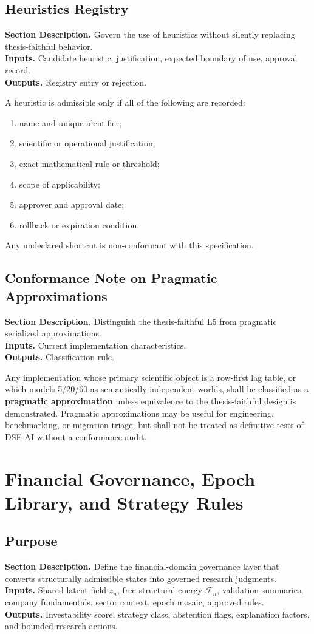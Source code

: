 \documentclass[11pt]{report}
\newcommand{\meta}[3]{\textbf{Section Description.} #1\\
\textbf{Inputs.} #2\\
\textbf{Outputs.} #3\par}
\begin{document}
\section{Heuristics Registry}
\meta{Govern the use of heuristics without silently replacing thesis-faithful behavior.}{Candidate heuristic, justification, expected boundary of use, approval record.}{Registry entry or rejection.}

A heuristic is admissible only if all of the following are recorded:
\begin{enumerate}[leftmargin=1.2cm]
    \item name and unique identifier;
    \item scientific or operational justification;
    \item exact mathematical rule or threshold;
    \item scope of applicability;
    \item approver and approval date;
    \item rollback or expiration condition.
\end{enumerate}
Any undeclared shortcut is non-conformant with this specification.

\section{Conformance Note on Pragmatic Approximations}
\meta{Distinguish the thesis-faithful L5 from pragmatic serialized approximations.}{Current implementation characteristics.}{Classification rule.}

Any implementation whose primary scientific object is a row-first lag table, or which models 5/20/60 as semantically independent worlds, shall be classified as a \textbf{pragmatic approximation} unless equivalence to the thesis-faithful design is demonstrated. Pragmatic approximations may be useful for engineering, benchmarking, or migration triage, but shall not be treated as definitive tests of DSF-AI without a conformance audit.


\chapter{Financial Governance, Epoch Library, and Strategy Rules}
\section{Purpose}
\meta{Define the financial-domain governance layer that converts structurally admissible states into governed research judgments.}{Shared latent field $z_n$, free structural energy $\mathcal{F}_n$, validation summaries, company fundamentals, sector context, epoch mosaic, approved rules.}{Investability score, strategy class, abstention flags, explanation factors, and bounded research actions.}
\end{document}
